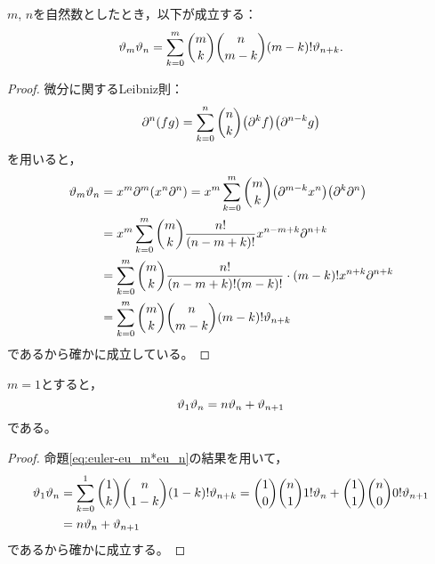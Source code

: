\documentclass[a4paper,draft]{ltjsarticle}
\begin{document}
\begin{prop}
    $m$, $n$を自然数としたとき，以下が成立する：
    \begin{equation}
        \eu{m}\eu{n}=\sum_{k=0}^m \binom{m}{k}\binom{n}{m-k}\pare{m-k}! \eu{n+k}.
        \label{eq:euler-eu_m*eu_n}
    \end{equation}
    \begin{proof}
        微分に関するLeibniz則：
        \begin{equation}
            \partial^n\pare{fg} = \sum_{k=0}^n \binom{n}{k} \pare{\partial^k f}\pare{\partial^{n-k}g}
        \end{equation}
        を用いると，
        \begin{align}
            \eu{m}\eu{n}&=\Eu{m}\pare{\Eu{n}}
            =x^m\sum_{k=0}^m \binom{m}{k}\pare{\partial^{m-k} x^n} \pare{\partial^k \partial^n}
            \\
            &=x^m \sum_{k=0}^m \binom{m}{k} \frac{n!}{\pare{n-m+k}!}x^{n-m+k}\partial^{n+k}
            \\
            &=\sum_{k=0}^m \binom{m}{k}\frac{n!}{\pare{n-m+k}!\pare{m-k}!}\cdot \pare{m-k}! x^{n+k}\partial^{n+k}
            \\
            &=\sum_{k=0}^m \binom{m}{k}\binom{n}{m-k}\pare{m-k}! \eu{n+k}
        \end{align}
        であるから確かに成立している。
    \end{proof}
\end{prop}

\begin{cor}\label{cor:euler-eu_1*eu_n}
    $m=1$とすると，
    \begin{equation}
        \vartheta_{1}\vartheta_{n}=n\vartheta_{n}+\vartheta_{n+1}
    \end{equation}
    である。
    \begin{proof}
        命題\ref{eq:euler-eu_m*eu_n}の結果を用いて，
        \begin{align}
            \eu{1}\eu{n}
            &=\sum_{k=0}^{1}\binom{1}{k}\binom{n}{1-k}\pare{1-k}!\eu{n+k}
            =\binom{1}{0}\binom{n}{1}1! \eu{n}+ \binom{1}{1}\binom{n}{0}0!\eu{n+1}
            \\
            &=n\eu{n}+\eu{n+1}
        \end{align}
        であるから確かに成立する。
    \end{proof}
\end{cor}
\end{document}
